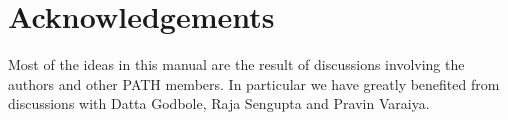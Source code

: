 \date{}

\maketitle








\section*{Acknowledgements}

Most of the ideas in this manual are the result of discussions
involving the authors and other PATH members. In particular we have
greatly benefited from discussions with Datta Godbole, Raja Sengupta
and Pravin Varaiya.




